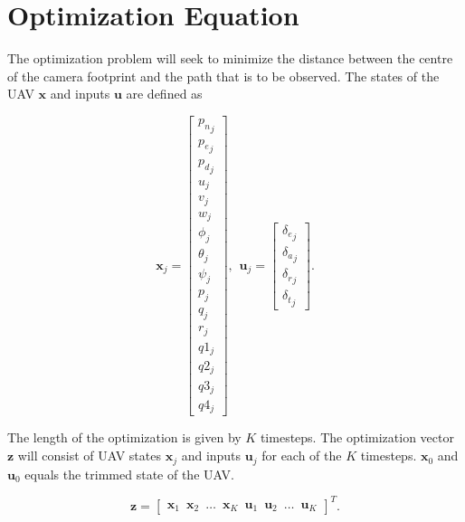 \section*{Optimization Equation}

The optimization problem will seek to minimize the distance between the centre of the camera footprint and the path that is to be observed. The states of the UAV $\mathbf{x}$ and inputs $\mathbf{u}$ are defined as

\begin{equation}
	\mathbf{x}_j = 
	\begin{bmatrix}
		{p_n}_j 	\\ {p_e}_j		\\ {p_d}_j	\\
		u_j 		\\ v_j   		\\ w_j 	\\ 
		\phi_j	\\ \theta_j	\\ \psi_j	\\
		p_j		\\ q_j		\\ r_j \\
		q1_j \\ q2_j \\ q3_j \\ q4_j
	\end{bmatrix}, \hspace{5pt}
	\mathbf{u}_j = 
	\begin{bmatrix}
		{\delta_e}_j \\ {\delta_a}_j	\\ {\delta_r}_j	\\ {\delta_t}_j
	\end{bmatrix}.
\end{equation}

The length of the optimization is given by $K$ timesteps. The optimization vector $\mathbf{z}$ will consist of UAV states $\mathbf{x}_j$ and inputs $\mathbf{u}_j$ for each of the $K$ timesteps. $\mathbf{x}_0$ and $\mathbf{u}_0$ equals the trimmed state of the UAV.

\begin{equation}
	\mathbf{z} =
	\begin{bmatrix}
		\mathbf{x}_1 \hspace{6pt} \mathbf{x}_2 \hspace{6pt} \hdots \hspace{6pt} \mathbf{x}_K \hspace{6pt} \mathbf{u}_1 \hspace{6pt} \mathbf{u}_2 \hspace{6pt} \hdots \hspace{6pt} \mathbf{u}_K
	\end{bmatrix}^T.
\end{equation}


